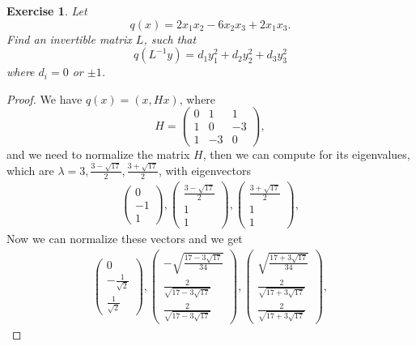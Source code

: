 \documentclass[10pt]{book}
\newtheorem{exercise}{Exercise}[section]
\theoremstyle{definition}
\numberwithin{equation}{chapter}
\begin{document}
\begin{exercise}
Let%
$$
q\left(x\right) = 2x_{1}x_{2}-6x_{2}x_{3}+2x_{1}x_{3}.
$$
Find an invertible matrix $L$, such that%
$$
q\left(  L^{-1}y\right)  =d_{1}y_{1}^{2}+d_{2}y_{2}^{2}+d_{3}y_{3}^{2}%
$$
where $d_{i}=0$ or $\pm1$.
\end{exercise}
\begin{proof}
We have $q(x) = (x,Hx)$, where 
$$
H = \left(
\begin{matrix}
0 & 1 & 1\\
1 & 0 & -3\\
1 & -3 & 0
\end{matrix}
\right),
$$
and we need to normalize the matrix $H$, then we can compute for its eigenvalues, which are $\lambda = 3, \frac{3-\sqrt{17}}{2}, \frac{3+\sqrt{17}}{2}$, with eigenvectors 
\begin{align*}
    \left(\begin{matrix} 0 \\ - 1\\ 1 
    \end{matrix}\right), 
    \left(\begin{matrix} \frac{3-\sqrt{17}}{2} \\ 1\\ 1 
    \end{matrix}\right), 
    \left(\begin{matrix} \frac{3+\sqrt{17}}{2} \\ 1\\ 1 
    \end{matrix}\right), 
\end{align*}
Now we can normalize these vectors and we get 
\begin{align*}
    \left(\begin{matrix} 0 \\ - \frac{1}{\sqrt{2}}\\ \frac{1}{\sqrt{2}} 
    \end{matrix}\right), 
    \left(\begin{matrix} -\sqrt{\frac{17-3\sqrt{17}}{34}} \\ \frac{2}{\sqrt{17-3\sqrt{17}}}\\ \frac{2}{\sqrt{17-3\sqrt{17}}} 
    \end{matrix}\right), 
    \left(\begin{matrix} \sqrt{\frac{17+3\sqrt{17}}{34}} \\ \frac{2}{\sqrt{17+3\sqrt{17}}} \\ \frac{2}{\sqrt{17+3\sqrt{17}}} 
    \end{matrix}\right), 

\end{align*}
\end{proof}
\end{document}
